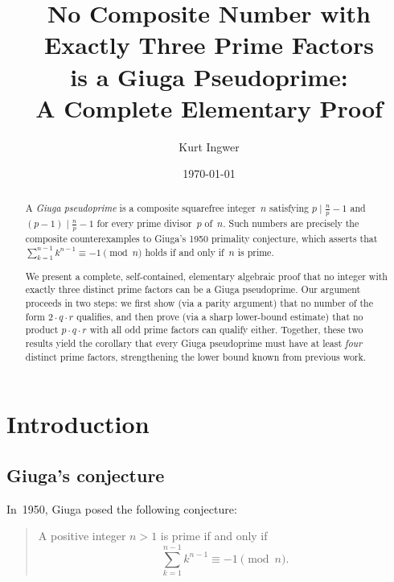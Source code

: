 \documentclass[12pt,a4paper]{amsart}
\theoremstyle{definition}
\begin{document}

\title{No Composite Number with Exactly Three Prime Factors\\
       is a Giuga Pseudoprime:\\
       A Complete Elementary Proof}

\author{Kurt Ingwer}
\address{Specialist Mathematics Project, Version Build 43}
\date{\today}

\begin{abstract}
A \emph{Giuga pseudoprime} is a composite squarefree integer~$n$ satisfying
$p \mid \tfrac{n}{p} - 1$ and $(p-1) \mid \tfrac{n}{p} - 1$
for every prime divisor~$p$ of~$n$.
Such numbers are precisely the composite counterexamples to Giuga's 1950
primality conjecture, which asserts that
$\sum_{k=1}^{n-1} k^{n-1} \equiv -1 \pmod{n}$ holds if and only if~$n$ is prime.

We present a complete, self-contained, elementary algebraic proof that no
integer with exactly three distinct prime factors can be a Giuga pseudoprime.
Our argument proceeds in two steps: we first show (via a parity argument) that
no number of the form $2 \cdot q \cdot r$ qualifies, and then prove (via a
sharp lower-bound estimate) that no product $p \cdot q \cdot r$ with all
odd prime factors can qualify either.  Together, these two results yield the
corollary that every Giuga pseudoprime must have at least \emph{four} distinct
prime factors, strengthening the lower bound known from previous work.
\end{abstract}

\maketitle

\section{Introduction}

\subsection{Giuga's conjecture}

In~1950, Giuga \cite{Giuga1950} posed the following conjecture:

\begin{quote}
  A positive integer $n > 1$ is prime if and only if
  \[
    \sum_{k=1}^{n-1} k^{n-1} \equiv -1 \pmod{n}.
  \]
\end{quote}
\end{document}
